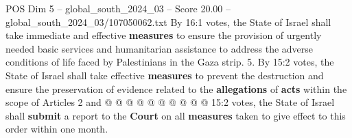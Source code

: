 \begin{textsample}{POS Dim 5 – global\_south\_2024\_03 – Score 20.00 – global\_south\_2024\_03/107050062.txt}
By 16:1 votes, the State of Israel shall take immediate and effective \textbf{measures} to ensure the provision of urgently needed basic services and humanitarian assistance to address the adverse conditions of life faced by Palestinians in the Gaza strip. 5.
By 15:2 votes, the State of Israel shall take effective \textbf{measures} to prevent the destruction and ensure the preservation of evidence related to the \textbf{allegations} of \textbf{acts} within the scope of Articles 2 and @ @ @ @ @ @ @ @ @ @ 15:2 votes, the State of Israel shall \textbf{submit} a report to the \textbf{Court} on all \textbf{measures} taken to give effect to this order within one month.

\end{textsample}
